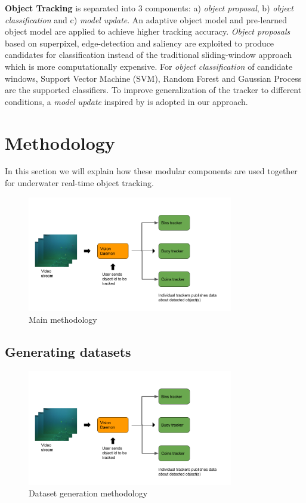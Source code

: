 \documentclass[fypca]{socreport}
\begin{document}
\textbf{Object Tracking} is separated into 3 components: a) \textit{object
  proposal}, b) \textit{object classification} and c) \textit{model update}. An
adaptive object model and pre-learned object model are applied to achieve higher
tracking accuracy. \textit{Object proposals} based on superpixel, edge-detection
and saliency are exploited to produce candidates for classification instead of
the traditional sliding-window approach which is more computationally expensive.
For \textit{object classification} of candidate windows, Support Vector Machine
(SVM), Random Forest and Gaussian Process are the supported classifiers.
To improve generalization of the tracker to different conditions, a
\textit{model update} inspired by  is adopted in our approach.

\newpage
\section{Methodology}

In this section we will explain how these modular components are used together
for underwater real-time object tracking.

\begin{figure}[H]
\centering
  \includegraphics[width=0.8\textwidth, height=0.3\textheight]{method.png}
  \caption{Main methodology}
  \label{fig:main_methodology}
\end{figure}

\subsection{Generating datasets}

\begin{figure}[H]
\centering
  \includegraphics[width=0.8\textwidth, height=0.3\textheight]{dataset_method.png}
  \caption{Dataset generation methodology}
  \label{fig:dataset_methodology}
\end{figure}
\end{document}
